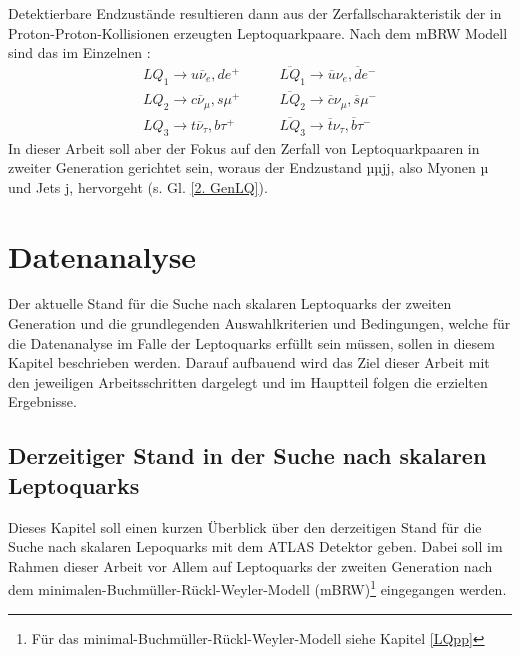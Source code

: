 Detektierbare Endzustände resultieren dann aus der Zerfallscharakteristik der in Proton-Proton-Kollisionen erzeugten Leptoquarkpaare. Nach dem mBRW Modell sind das im Einzelnen \cite{Schrempp}:
\begin{align}
  LQ_1\rightarrow u\overline{\nu}_e, de^+&\qquad \overline{LQ}_1\rightarrow \overline{u}\nu_e, \overline{d}e^-\\
  LQ_2\rightarrow c\overline{\nu}_\mu, s\mu^+&\qquad \overline{LQ}_2\rightarrow \overline{c}\nu_\mu, \overline{s}\mu^-\label{2. GenLQ}\\
  LQ_3\rightarrow t\overline{\nu}_\tau, b\tau^+&\qquad \overline{LQ}_3\rightarrow \overline{t}\nu_\tau, \overline{b}\tau^-
\end{align}
In dieser Arbeit soll aber der Fokus auf den Zerfall von Leptoquarkpaaren in zweiter Generation gerichtet sein, woraus der Endzustand µµjj, also Myonen µ und Jets j, hervorgeht (s. Gl. \ref{2. GenLQ}).
\chapter{Datenanalyse}%
Der aktuelle Stand für die Suche nach skalaren Leptoquarks der zweiten Generation und die grundlegenden Auswahlkriterien und Bedingungen, welche für die Datenanalyse im Falle der Leptoquarks erfüllt sein müssen, sollen in diesem Kapitel beschrieben werden. Darauf aufbauend wird das Ziel dieser Arbeit mit den jeweiligen Arbeitsschritten dargelegt und im Hauptteil folgen die erzielten Ergebnisse.
\section{Derzeitiger Stand in der Suche nach skalaren Leptoquarks}\label{derzeitigerStand}%
Dieses Kapitel soll einen kurzen Überblick über den derzeitigen Stand für die Suche nach skalaren Lepoquarks mit dem ATLAS Detektor geben. Dabei soll im Rahmen dieser Arbeit vor Allem auf Leptoquarks der zweiten Generation nach dem minimalen-Buchmüller-Rückl-Weyler-Modell (mBRW)\footnote{Für das minimal-Buchmüller-Rückl-Weyler-Modell siehe Kapitel \ref{LQpp}} eingegangen werden.

